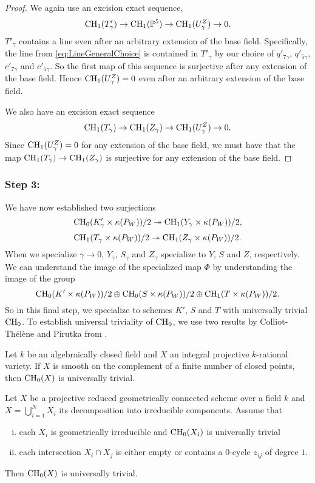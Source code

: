 \begin{proof}
We again use an excision exact sequence,
\[\operatorname{CH}_1(T'_\gamma) \to \operatorname{CH}_1(\mathbb{P}^5) \to \operatorname{CH}_1(U^Z_\gamma) \to 0. \]
$T'_\gamma$ contains a line even after an arbitrary extension of the base field. Specifically, the line from \eqref{eq:LineGeneralChoice} is contained in $T'_\gamma$ by our choice of $q'_{7\gamma}$, $q'_{5\gamma}$, $c'_{7\gamma}$ and $c'_{5\gamma}$. So the first map of this sequence is surjective after any extension of the base field. Hence $\operatorname{CH}_1(U^Z_\gamma) = 0$ even after an arbitrary extension of the base field.

We also have an excision exact sequence 
\[\operatorname{CH}_1(T_\gamma) \to \operatorname{CH}_1(Z_\gamma) \to \operatorname{CH}_1(U^Z_\gamma) \to 0. \]
Since $\operatorname{CH}_1(U^Z_\gamma) = 0$ for any extension of the base field, we must have that the map $\operatorname{CH}_1(T_\gamma) \to \operatorname{CH}_1(Z_\gamma)$ is surjective for any extension of the base field.
\end{proof}


\subsubsection*{Step 3:}
 We have now established two surjections
\[\operatorname{CH}_0(K'_\gamma \times \kappa(P_W))/2 \twoheadrightarrow \operatorname{CH}_1(Y_\gamma \times \kappa(P_W))/2, \]
\[\operatorname{CH}_1(T_\gamma \times \kappa(P_W))/2 \twoheadrightarrow \operatorname{CH}_1(Z_\gamma \times \kappa(P_W))/2. \]
When we specialize $\gamma \to 0$, $Y_\gamma$, $S_\gamma$ and $Z_\gamma$ specialize to $Y$, $S$ and $Z$, respectively. We can understand the image of the specialized map $\Phi$ by understanding the image of the group
\[\operatorname{CH}_0(K' \times \kappa(P_W))/2 \oplus \operatorname{CH}_0(S \times \kappa(P_W))/2 \oplus \operatorname{CH}_1(T\times \kappa(P_W))/2.\]
So in this final step, we specialize to schemes $K'$, $S$ and $T$ with universally trivial $\operatorname{CH}_0$. To establish universal triviality of $\operatorname{CH}_0$, we use two results by Colliot-Thélène and Pirutka from \cite{ColliotThelenePirutkaCyclicCovers}.
\begin{lemma}
	\label{lem:RationalCH0Trivial}
	Let $k$ be an algebraically closed field and $X$ an integral projective $k$-rational variety. If $X$ is smooth on the complement of a finite number of closed points, then $\operatorname{CH}_0(X)$ is universally trivial.
\end{lemma}
\begin{lemma}
	\label{lem:CH0TrivialComponents}
	Let $X$ be a projective reduced geometrically connected scheme over a field $k$ and $X = \bigcup_{i=1}^N X_i$ its decomposition into irreducible components. Assume that
	\begin{enumerate}[i)]
		\item each $X_i$ is geometrically irreducible and $\operatorname{CH}_0(X_i)$ is universally trivial
		\item each intersection $X_i \cap X_j$ is either empty or contains a $0$-cycle $z_{ij}$ of degree $1$.
	\end{enumerate}
	Then $\operatorname{CH}_0(X)$ is universally trivial.
\end{lemma}

